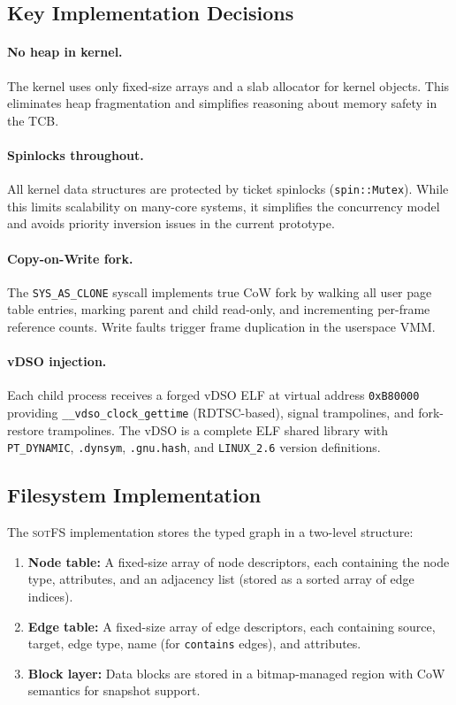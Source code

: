 \documentclass[11pt,a4paper]{article}
\theoremstyle{definition}
\theoremstyle{remark}
\newcommand{\sotfs}{\textsc{sotFS}}
\begin{document}
\subsection{Key Implementation Decisions}
\label{sec:impl-decisions}

\paragraph{No heap in kernel.}
The kernel uses only fixed-size arrays and a slab allocator for
kernel objects. This eliminates heap fragmentation and simplifies
reasoning about memory safety in the TCB.

\paragraph{Spinlocks throughout.}
All kernel data structures are protected by ticket spinlocks
(\texttt{spin::Mutex}). While this limits scalability on many-core
systems, it simplifies the concurrency model and avoids priority
inversion issues in the current prototype.

\paragraph{Copy-on-Write fork.}
The \texttt{SYS\_AS\_CLONE} syscall implements true CoW fork by
walking all user page table entries, marking parent and child
read-only, and incrementing per-frame reference counts. Write faults
trigger frame duplication in the userspace VMM.

\paragraph{vDSO injection.}
Each child process receives a forged vDSO ELF at virtual address
\texttt{0xB80000} providing \texttt{\_\_vdso\_clock\_gettime}
(RDTSC-based), signal trampolines, and fork-restore trampolines.
The vDSO is a complete ELF shared library with \texttt{PT\_DYNAMIC},
\texttt{.dynsym}, \texttt{.gnu.hash}, and \texttt{LINUX\_2.6}
version definitions.

\subsection{Filesystem Implementation}
\label{sec:impl-fs}

The \sotfs{} implementation stores the typed graph in a two-level
structure:

\begin{enumerate}
\item \textbf{Node table:} A fixed-size array of node descriptors,
  each containing the node type, attributes, and an adjacency list
  (stored as a sorted array of edge indices).

\item \textbf{Edge table:} A fixed-size array of edge descriptors,
  each containing source, target, edge type, name (for
  \texttt{contains} edges), and attributes.

\item \textbf{Block layer:} Data blocks are stored in a bitmap-managed
  region with CoW semantics for snapshot support.
\end{enumerate}
\end{document}
